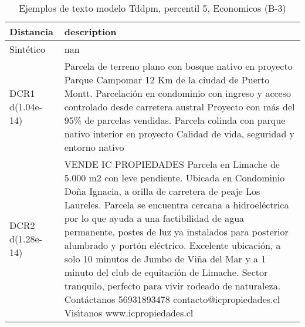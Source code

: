 \begin{table}[H]
\centering
\fontsize{10}{14}\selectfont
\caption{Ejemplos de texto modelo Tddpm, percentil 5, Economicos (B-3)}
\label{table-example-economicos-b-3-tddpm_mlp-5p-text}
\begin{tabular}{|l|m{35em}|}
\hline
\rowcolor[gray]{0.8}
Distancia & description \\
\hline Sintético & nan \\
\hline DCR1 d(1.04e-14) & Parcela de terreno plano con bosque nativo en proyecto Parque Campomar 12 Km de la ciudad de Puerto Montt.  Parcelaci\'on en condominio con ingreso y acceso controlado desde carretera austral Proyecto con m\'as del 95\% de parcelas vendidas.  Parcela colinda con parque nativo interior en proyecto Calidad de vida, seguridad y entorno nativo \\
\hline DCR2 d(1.28e-14) & VENDE IC PROPIEDADES  Parcela en Limache de 5.000 m2 con leve pendiente. Ubicada en Condominio Do\~na Ignacia, a orilla de carretera de peaje Los Laureles. Parcela se encuentra cercana a hidroel\'ectrica por lo que ayuda a una factibilidad de agua permanente, postes de luz ya instalados para posterior alumbrado y port\'on el\'ectrico.  Excelente ubicaci\'on, a solo 10 minutos de Jumbo de Vi\~na del Mar y a 1 minuto del club de equitaci\'on de Limache. Sector tranquilo, perfecto para vivir rodeado de naturaleza.  Cont\'actanos 56931893478 contacto@icpropiedades.cl  Vis{\'\i}tanos www.icpropiedades.cl \\
\hline
\end{tabular}
\end{table}
